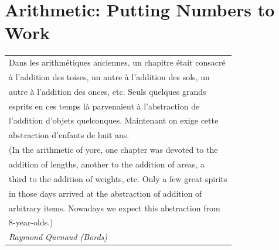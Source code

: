 
\chapter{Arithmetic: Putting Numbers to Work}
\label{ch:arithmetic}


\hfill {\em
\begin{tabular}{l}
Dans les arithm\'{e}tiques anciennes, un chapitre \'{e}tait consacr\'{e} \\
\hspace*{.25in}\`{a} l'addition des toises, un autre \`{a} l'addition des sols, un \\
\hspace*{.25in}autre \`{a} l'addition des onces, etc.  Seuls quelques grands \\
\hspace*{.25in}esprits en ces temps l\`{a} parvenaient \`{a} l'abstraction de \\
\hspace*{.25in}l'addition d'objets quelconques.  Maintenant on exige cette \\
\hspace*{.25in}abstraction d'enfants de huit ans. \\
(In the arithmetic of yore, one chapter was devoted to the \\
\hspace*{.25in}addition of lengths, another to the addition of areas, a \\
\hspace*{.25in}third to the addition of weights, etc. Only a few great spirits  \\
\hspace*{.25in}in those days arrived at the abstraction of addition of    \\
\hspace*{.25in}arbitrary items.  Nowadays we expect this abstraction from  \\
\hspace*{.25in}8-year-olds.) \\
\hfill {\em\small Raymond Quenaud ({\em Bords})}
\end{tabular} }


%
%
%
%
%


